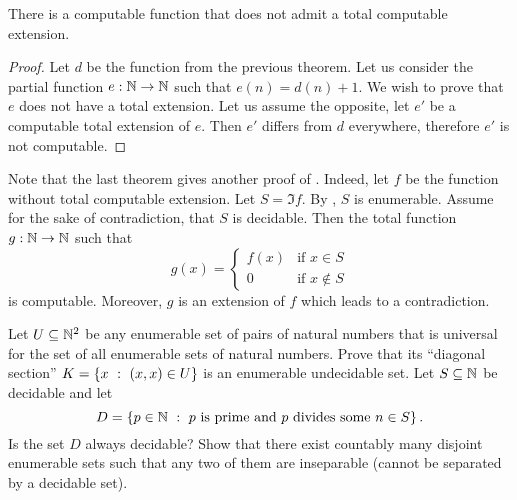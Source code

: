 \begin{theorem}
    There is a computable function that does not admit a total computable
    extension.
\end{theorem}
\begin{proof}
  Let $d$ be the function from the previous theorem. Let us consider the
  partial function $e : {\mathbb{N}} \to {\mathbb{N}}$ such that $e(n) = d(n) + 1$.
  We wish to prove that $e$ does not have a total extension. Let us assume
  the opposite, let $e'$ be a computable total extension of $e$. Then $e'$
  differs from $d$ everywhere, therefore $e'$ is not computable.
\end{proof}

Note that the last theorem gives another proof of
. Indeed, let $f$ be the function
without total computable extension. Let $S = \Im{f}$.
By ,
$S$ is enumerable. Assume for the sake of contradiction, that $S$ is decidable.
Then the total function $g : {\mathbb{N}} \to {\mathbb{N}}$ such that
\[
    g(x) =
    \begin{cases}
        f(x) & \text{if } x \in S \\
        0 & \text{if } x \notin S
    \end{cases}
\]
is computable. Moreover, $g$ is an extension of $f$ which leads to a
contradiction.

\begin{chapterendexercises}
    \exercise Let $U \subseteq {\mathbb{N}}^2$ be any enumerable set of pairs of
        natural numbers that is universal for the set of all
        enumerable sets of natural numbers.
        Prove that its ``diagonal section''
        $K = \set[(x, x) \in U]{x}$ is an enumerable undecidable set.
    \exercise Let $S \subseteq {\mathbb{N}}$ be decidable and let
        \[
            D =
            \set[
                p \text{ is prime and }
                p \text{ divides some } n \in S
            ]{p \in \N}.
        \]
        Is the set $D$ always decidable?
    \exercise Show that there exist countably many disjoint
        enumerable sets such that any two of them are inseparable
        (cannot be separated by a decidable set).
\end{chapterendexercises}
